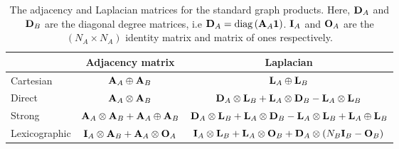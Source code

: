 \begin{table}[b]
    \def\arraystretch{1.9}
    \centering
    \small
    \vspace{0.5cm}
    \setlength{\tabcolsep}{10pt}
    \begin{tabular}{l c c}
        \toprule

         & Adjacency matrix & Laplacian \\

        \midrule

        Cartesian
         & $\mathbf{A}_A \oplus \mathbf{A}_B$
         & $\mathbf{L}_A \oplus \mathbf{L}_B$                                                                   \\

        Direct
         & $\mathbf{A}_A \otimes \mathbf{A}_B$
         & $\mathbf{D}_A \otimes \mathbf{L}_B + \mathbf{L}_A \otimes \mathbf{D}_B - \mathbf{L}_A \otimes \mathbf{L}_B$                        \\

        Strong
         & $\mathbf{A}_A \otimes \mathbf{A}_B + \mathbf{A}_A \oplus \mathbf{A}_B$
         & $\mathbf{D}_A \otimes \mathbf{L}_B + \mathbf{L}_A \otimes \mathbf{D}_B - \mathbf{L}_A \otimes \mathbf{L}_B + \mathbf{L}_A \oplus \mathbf{L}_B$   \\

        Lexicographic
         & $\mathbf{I}_A \otimes \mathbf{A}_B + \mathbf{A}_A \otimes \mathbf{O}_A$
         & $\mathbf{I}_A \otimes \mathbf{L}_B + \mathbf{L}_A \otimes \mathbf{O}_B + \mathbf{D}_A \otimes (N_B \mathbf{I}_B - \mathbf{O}_B)$ \\

        \bottomrule
    \end{tabular}
    \vspace{0.2cm}
    \caption[The adjacency and Laplacian matrices for the standard graph products]{The adjacency and Laplacian matrices for the standard graph products. Here, $\mathbf{D}_A$ and $\mathbf{D}_B$ are the diagonal degree matrices, i.e $\mathbf{D}_A = \text{\textup{diag}}\left(\mathbf{A}_A \mathbf{1}\right)$. $\mathbf{I}_A$ and $\mathbf{O}_A$ are the $(N_A \times N_A)$ identity matrix and matrix of ones respectively. }
    \vspace{0.3cm}
    \label{tab:grap_product_matrices}
\end{table}



